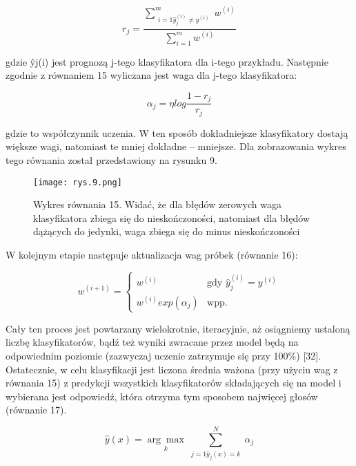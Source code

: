 \begin{equation}
r_j = \frac { \sum\limits_{\substack{i=1
\hat y_j^{(i)} \neq y^{(i)}}}^{m} w^{(i)}}{{\sum\limits_{i=1}^{m} w^{(i)}}}
\end{equation}

\noindent gdzie ŷj(i) jest prognozą j-tego klasyfikatora dla i-tego przykładu. Następnie zgodnie z  równaniem 15 wyliczana jest waga dla j-tego klasyfikatora:

\begin{equation}
\alpha_j=\eta log\frac {1-r_j} {r_j}
\end{equation}

\noindent gdzie to współczynnik uczenia. W ten sposób dokładniejsze klasyfikatory dostają 
większe wagi, natomiast te mniej dokładne – mniejsze. Dla zobrazowania wykres tego równania został przedstawiony na rysunku 9.

\begin{figure}[h]
    \centering
    \texttt{[image: rys.9.png]}
    \caption{Wykres równania 15. Widać, że dla błędów zerowych waga klasyfikatora zbiega się do nieskończoności, natomiast dla błędów dążących do jedynki, waga zbiega się do minus nieskończoności}
    \label{fig:mesh9}
\end{figure}

\noindent W kolejnym etapie następuje aktualizacja wag próbek (równanie 16):

\begin{equation}
w^{(i+1)} =
\begin{cases}
  w^{(i)} & \text{gdy } \hat {y}_j^{(i)} = y^{(i)}\\
  w^{(i)}exp(\alpha_j) & \text{wpp.}
\end{cases}
\end{equation}

\noindent  Cały ten proces jest powtarzany wielokrotnie, iteracyjnie, aż osiągniemy ustaloną liczbę klasyfikatorów, bądź też wyniki zwracane przez model będą na odpowiednim
poziomie (zazwyczaj uczenie zatrzymuje się przy 100\%) [32]. Ostatecznie, w celu klasyfikacji jest liczona średnia ważona (przy użyciu wag z równania 15) z predykcji wszystkich klasyfikatorów składających się na model i wybierana jest odpowiedź, która otrzyma tym sposobem najwięcej głosów (równanie 17).

\begin{equation}
\hat y (x) = \underset{k}{\arg\max} \sum_{\substack{j=1
\hat y_j(x)=k}}^N \alpha_j
\end{equation}

